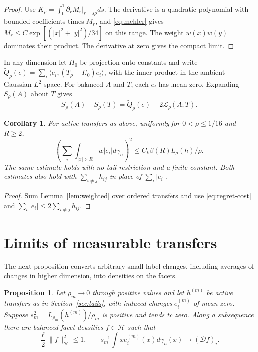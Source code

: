 \documentclass[11pt,reqno]{amsart}
\newtheorem{proposition}[theorem]{Proposition}
\newtheorem{corollary}[theorem]{Corollary}
\newcommand{\norm}[1]{\lVert #1\rVert}
\newcommand{\ga}{\gamma}
\newcommand{\LL}{\mathcal L}
\newcommand{\HH}{\mathcal H}
\newcommand{\DD}{\mathcal D}
\begin{document}
\begin{proof}
Use $K_\rho=\int_0^1\partial_rM_r|_{r=s\rho}ds$.
The derivative is a quadratic polynomial with bounded coefficients
times $M_r$, and \eqref{eq:mehler} gives
$M_r\le C\exp[(|x|^2+|y|^2)/34]$ on this range.
The weight $w(x)w(y)$ dominates their product. The derivative at zero
gives the compact limit.
\end{proof}

In any dimension let $\Pi_0$ be projection onto constants and write
$\widetilde Q_\rho(e)=\sum_i\langle e_i,(T_\rho-\Pi_0)e_i\rangle$,
with the inner product in the ambient Gaussian $L^2$ space.
For balanced $A$ and $T$, each $e_i$ has mean zero.
Expanding $S_\rho(A)$ about $T$ gives
\begin{equation}\label{eq:comparison}
 S_\rho(A)-S_\rho(T)=\widetilde Q_\rho(e)-2\LL_\rho(A;T).
\end{equation}

\begin{corollary}\label{cor:exterior}
For active transfers as above, uniformly for $0<\rho\le1/16$ and $R\ge2$,
\begin{equation}\label{eq:tv-tail}
 \left(\sum_i\int_{|x|>R}w|e_i|d\ga_n\right)^2
 \le C_k\beta(R)L_\rho(h)/\rho.
\end{equation}
The same estimate holds with no tail restriction and a finite
constant. Both estimates also hold with $\sum_{i\ne j}h_{ij}$
in place of $\sum_i|e_i|$.
\end{corollary}

\begin{proof}
Sum Lemma~\ref{lem:weighted} over ordered transfers and use
\eqref{eq:regret-cost} and $\sum_i|e_i|\le2\sum_{i\ne j}h_{ij}$.
\end{proof}

\section{Limits of measurable transfers}\label{sec:compactness}

The next proposition converts arbitrary small label changes, including
averages of changes in higher dimension, into densities on the facets.

\begin{proposition}\label{prop:compactness}
Let $\rho_m\to0$ through positive values and let $h^{(m)}$ be active
transfers as in Section~\ref{sec:tails}, with induced changes
$e_i^{(m)}$ of mean zero. Suppose $s_m^2=L_{\rho_m}(h^{(m)})/\rho_m$
is positive and tends to zero. Along a subsequence there are balanced
facet densities $f\in\HH$ such that
\[
 \frac{\ell}{2}\norm f_\HH^2\le1,\qquad
 s_m^{-1}\int x e_i^{(m)}(x)d\ga_n(x)\longrightarrow(\DD f)_i.
\]
\end{proposition}
\end{document}
